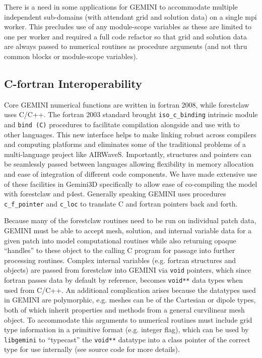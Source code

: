 \documentclass[11pt,letterpaper]{article}
\begin{document}
There is a need in some applications for GEMINI to accommodate multiple independent sub-domains (with attendant grid and solution data) on a single mpi worker.  This precludes use of any module-scope variables as these are limited to one per worker and required a full code refactor so that grid and solution data are always passed to numerical routines as procedure arguments (and not thru common blocks or module-scope variables).  

\subsection{C-fortran Interoperability}

Core GEMINI numerical functions are written in fortran 2008, while forestclaw uses C/C++.  The fortran 2003 standard brought \texttt{iso\_c\_binding} intrinsic module and \texttt{bind (C)} procedures to facilitate compilation alongside and use with to other languages.  This new interface helps to make linking robust across compilers and computing platforms and eliminates some of the traditional problems of a multi-language project like AIRWaveS.  Importantly, structures and pointers can be seamlessly passed between languages allowing flexibility in memory allocation and ease of integration of different code components.  We have made extensive use of these facilities in Gemini3D specifically to allow ease of co-compiling the model with forestclaw and p4est.  Generally speaking GEMINI uses procedures \texttt{c\_f\_pointer} and \texttt{c\_loc} to translate C and fortran pointers back and forth.  

Because many of the forestclaw routines need to be run on individual patch data, GEMINI must be able to accept mesh, solution, and internal variable data for a given patch into model computational routines while also returning opaque ``handles'' to these object to the calling C program for passage into further processing routines.  Complex internal variables (e.g. fortran structures and objects) are passed from forestclaw into GEMINI via \texttt{void} pointers, which since fortran passes data by default by reference, becomes \texttt{void**} data types when used from C/C++.  An additional complication arises because the datatypes used in GEMINI are polymorphic, e.g. meshes can be of the Cartesian or dipole types, both of which inherit properties and methods from a general curvilinear mesh object.  To accommodate this arguments to numerical routines must include grid type information in a primitive format (e.g. integer flag), which can be used by \texttt{libgemini} to ``typecast'' the \texttt{void**} datatype into a class pointer of the correct type for use internally (see source code for more details).  
\end{document}
